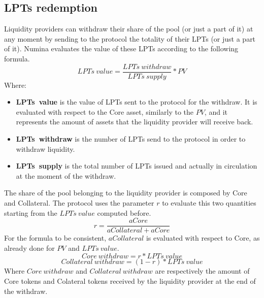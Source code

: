 \documentclass[12pt]{paper}
\begin{document}
	\subsection{LPTs redemption}
	\label{subsec:redemption}
	Liquidity providers can withdraw their share of the pool (or just a part of it) at any moment by sending to the protocol the totality of their LPTs (or just a part of it). Numina evaluates the value of these LPTs according to the following formula.
	\begin{equation}
		LPTs\ value = \frac{LPTs\ withdraw}{LPTs\ supply}*PV
	\end{equation}
	Where:
	\begin{itemize}
		\item \textbf{LPTs\ value} is the value of LPTs sent to the protocol for the withdraw. It is evaluated with respect to the Core asset, similarly to the $PV$, and it represents the amount of assets that the liquidity provider will receive back.
		\item \textbf{LPTs\ withdraw} is the number of LPTs send to the protocol in order to withdraw liquidity.
		\item \textbf{LPTs\ supply} is the total number of LPTs issued and actually in circulation at the moment of the withdraw.
	\end{itemize}
	The share of the pool belonging to the liquidity provider is composed by Core and Collateral. The protocol uses the parameter $r$ to evaluate this two quantities starting from the $LPTs\ value$ computed before.
	\begin{equation}
		r = \frac{aCore}{aCollateral + aCore}
	\end{equation}
	For the formula to be consistent, $aCollateral$ is evaluated with respect to Core, as already done for $PV$ and $LPTs\ value$.
	\begin{equation}
		Core\ withdraw = r * LPTs\ value
	\end{equation}
	\begin{equation}
		Collateral\ withdraw = (1-r) * LPTs\ value
	\end{equation}
	Where $Core\ withdraw$ and $Collateral\ withdraw$ are respectively the amount of Core tokens and Colateral tokens received by the liquidity provider at the end of the withdraw.
\end{document}
